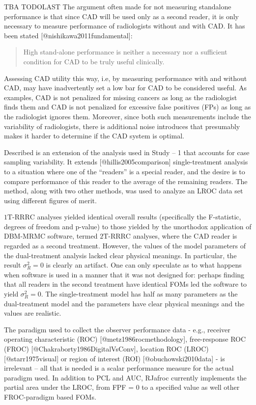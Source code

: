 \documentclass[
]{article}
\begin{document}
TBA TODOLAST The argument often made for not measuring standalone performance is that since CAD will be used only as a second reader, it is only necessary to measure performance of radiologists without and with CAD. It has been stated {[}@nishikawa2011fundamental{]}:

\begin{quote}
High stand-alone performance is neither a necessary nor a sufficient condition for CAD to be truly useful clinically.
\end{quote}

Assessing CAD utility this way, i.e, by measuring performance with and without CAD, may have inadvertently set a low bar for CAD to be considered useful. As examples, CAD is not penalized for missing cancers as long as the radiologist finds them and CAD is not penalized for excessive false positives (FPs) as long as the radiologist ignores them. Moreover, since both such measurements include the variability of radiologists, there is additional noise introduces that presumably makes it harder to determine if the CAD system is optimal.

Described is an extension of the analysis used in Study -- 1 that accounts for case sampling variability. It extends {[}@hillis2005comparison{]} single-treatment analysis to a situation where one of the ``readers'' is a special reader, and the desire is to compare performance of this reader to the average of the remaining readers. The method, along with two other methods, was used to analyze an LROC data set using different figures of merit.

\(\text{1T-RRRC}\) analyses yielded identical overall results (specifically the F-statistic, degrees of freedom and p-value) to those yielded by the unorthodox application of DBM-MRMC software, termed \(\text{2T-RRRC}\) analyses, where the CAD reader is regarded as a second treatment. However, the values of the model parameters of the dual-treatment analysis lacked clear physical meanings. In particular, the result \(\sigma_R^2 = 0\) is clearly an artifact. One can only speculate as to what happens when software is used in a manner that it was not designed for: perhaps finding that all readers in the second treatment have identical FOMs led the software to yield \(\sigma_R^2 = 0\). The single-treatment model has half as many parameters as the dual-treatment model and the parameters have clear physical meanings and the values are realistic.

The paradigm used to collect the observer performance data - e.g., receiver operating characteristic (ROC) {[}@metz1986rocmethodology{]}, free-response ROC (FROC) {[}@Chakraborty1986DigitalVsConv{]}, location ROC (LROC) {[}@starr1975visual{]} or region of interest (ROI) {[}@obuchowski2010data{]} - is irrelevant -- all that is needed is a scalar performance measure for the actual paradigm used. In addition to PCL and AUC, RJafroc currently implements the partial area under the LROC, from FPF = 0 to a specified value as well other FROC-paradigm based FOMs.
\end{document}
